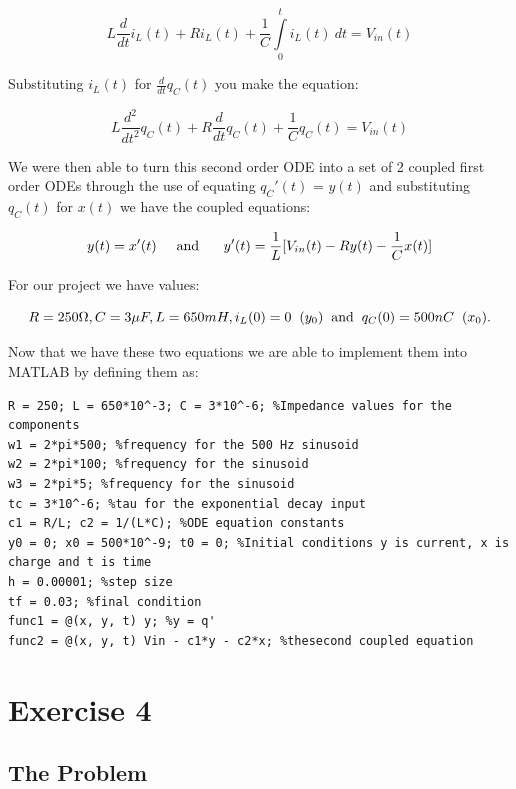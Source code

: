 \documentclass[11pt,a4paper]{article}
\begin{document}
\[ L \frac{d}{dt}i_L(t) + R i_L(t) + \frac{1}{C}\int\limits_0^t i_L(t) \ dt = V_{in}(t)\] 

Substituting $i_L(t)$ for $\frac{d}{dt}q_C(t)$ you make the equation:

\[ L \frac{d^2}{dt^2}q_C(t) + R\frac{d}{dt}q_C(t) + \frac{1}{C}q_C(t) = V_{in}(t)\]

We were then able to turn this second order ODE into a set of 2 coupled first order ODEs through the use of equating $q_C'(t)$ = $y(t)$ and substituting $q_C(t)$ for $x(t)$ we have the coupled equations:

\[y(t) = x'(t) \text{\hspace{5mm}and \hspace{5mm}}y'(t) = \frac{1}{L}[V_{in}(t)  - Ry(t) - \frac{1}{C}x(t)] \]

For our project we have values:

\[R = 250 \Omega, C = 3 \mu F , L = 650 mH, i_L(0) = 0 \hspace{2mm} (y_0) \text{\hspace{2mm}and\hspace{2mm}} q_C(0) = 500nC \hspace{2mm} (x_0).\]

Now that we have these two equations we are able to implement them into MATLAB by defining them as:

\begin{verbatim}
R = 250; L = 650*10^-3; C = 3*10^-6; %Impedance values for the components
w1 = 2*pi*500; %frequency for the 500 Hz sinusoid
w2 = 2*pi*100; %frequency for the sinusoid
w3 = 2*pi*5; %frequency for the sinusoid
tc = 3*10^-6; %tau for the exponential decay input
c1 = R/L; c2 = 1/(L*C); %ODE equation constants
y0 = 0; x0 = 500*10^-9; t0 = 0; %Initial conditions y is current, x is charge and t is time
h = 0.00001; %step size
tf = 0.03; %final condition
func1 = @(x, y, t) y; %y = q'
func2 = @(x, y, t) Vin - c1*y - c2*x; %thesecond coupled equation
\end{verbatim}


\section*{Exercise 4}\vspace{-1mm}
\subsection*{The Problem}
\end{document}
